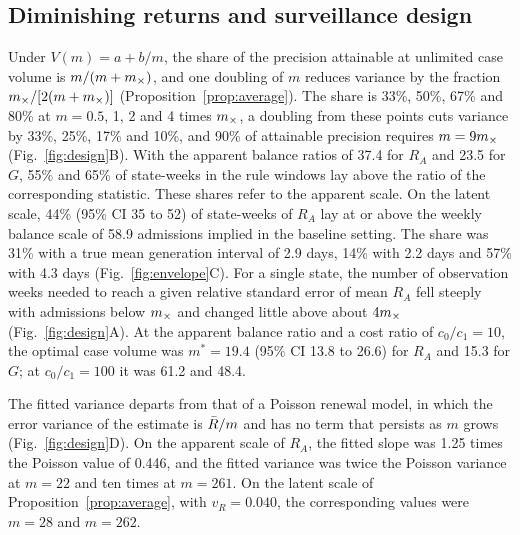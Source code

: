\subsection{Diminishing returns and surveillance design}
\label{sec:res-design}

Under $V(m)=a+b/m$, the share of the precision attainable at unlimited case volume is $m/(m+m_{\times})$, and one doubling of $m$ reduces variance by the fraction $m_{\times}/[2(m+m_{\times})]$ (Proposition~\ref{prop:average}). The share is 33\%, 50\%, 67\% and 80\% at $m=0.5$, 1, 2 and 4 times $m_{\times}$, a doubling from these points cuts variance by 33\%, 25\%, 17\% and 10\%, and 90\% of attainable precision requires $m=9m_{\times}$ (Fig.~\ref{fig:design}B). With the apparent balance ratios of 37.4 for $R_A$ and 23.5 for $G$, 55\% and 65\% of state-weeks in the rule windows lay above the ratio of the corresponding statistic. These shares refer to the apparent scale. On the latent scale, 44\% (95\% CI 35 to 52) of state-weeks of $R_A$ lay at or above the weekly balance scale of 58.9 admissions implied in the baseline setting. The share was 31\% with a true mean generation interval of 2.9 days, 14\% with 2.2 days and 57\% with 4.3 days (Fig.~\ref{fig:envelope}C). For a single state, the number of observation weeks needed to reach a given relative standard error of mean $R_A$ fell steeply with admissions below $m_{\times}$ and changed little above about $4m_{\times}$ (Fig.~\ref{fig:design}A). At the apparent balance ratio and a cost ratio of $c_0/c_1=10$, the optimal case volume was $m^*=19.4$ (95\% CI 13.8 to 26.6) for $R_A$ and 15.3 for $G$; at $c_0/c_1=100$ it was 61.2 and 48.4.

The fitted variance departs from that of a Poisson renewal model, in which the error variance of the estimate is $\bar{R}/m$ and has no term that persists as $m$ grows (Fig.~\ref{fig:design}D). On the apparent scale of $R_A$, the fitted slope was 1.25 times the Poisson value of 0.446, and the fitted variance was twice the Poisson variance at $m=22$ and ten times at $m=261$. On the latent scale of Proposition~\ref{prop:average}, with $v_R=0.040$, the corresponding values were $m=28$ and $m=262$.

